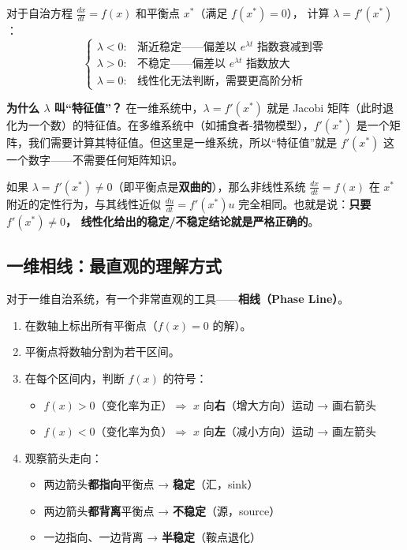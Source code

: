\documentclass[12pt,a4paper]{article}
\begin{document}
\begin{keypoint}
对于自治方程 $\frac{dx}{dt} = f(x)$ 和平衡点 $x^*$（满足 $f(x^*) = 0$），
计算 $\lambda = f'(x^*)$：
\[
\begin{cases}
\lambda < 0: & \text{渐近稳定——偏差以 } e^{\lambda t} \text{ 指数衰减到零} \\
\lambda > 0: & \text{不稳定——偏差以 } e^{\lambda t} \text{ 指数放大} \\
\lambda = 0: & \text{线性化无法判断，需要更高阶分析}
\end{cases}
\]
\end{keypoint}

\textbf{为什么 $\lambda$ 叫``特征值''？} 在一维系统中，$\lambda = f'(x^*)$ 就是 Jacobi 矩阵（此时退化为一个数）的特征值。在多维系统中（如捕食者-猎物模型），$f'(x^*)$ 是一个矩阵，我们需要计算其特征值。但这里是一维系统，所以``特征值''就是 $f'(x^*)$ 这一个数字——不需要任何矩阵知识。

\begin{theorybox}
如果 $\lambda = f'(x^*) \neq 0$（即平衡点是\textbf{双曲的}），那么非线性系统
$\frac{dx}{dt} = f(x)$ 在 $x^*$ 附近的定性行为，与其线性近似
$\frac{du}{dt} = f'(x^*) u$ 完全相同。也就是说：\textbf{只要 $f'(x^*) \neq 0$，
线性化给出的稳定/不稳定结论就是严格正确的}。
\end{theorybox}

\subsection{一维相线：最直观的理解方式}

对于一维自治系统，有一个非常直观的工具——\textbf{相线（Phase Line）}。

\begin{theorybox}[相线的画法]
\begin{enumerate}[label=(\arabic*)]
  \item 在数轴上标出所有平衡点（$f(x) = 0$ 的解）。
  \item 平衡点将数轴分割为若干区间。
  \item 在每个区间内，判断 $f(x)$ 的符号：
  \begin{itemize}
    \item $f(x) > 0$（变化率为正）$\Rightarrow$ $x$ 向\textbf{右}（增大方向）运动 → 画右箭头
    \item $f(x) < 0$（变化率为负）$\Rightarrow$ $x$ 向\textbf{左}（减小方向）运动 → 画左箭头
  \end{itemize}
  \item 观察箭头走向：
  \begin{itemize}
    \item 两边箭头\textbf{都指向}平衡点 → \textbf{稳定}（汇，sink）
    \item 两边箭头\textbf{都背离}平衡点 → \textbf{不稳定}（源，source）
    \item 一边指向、一边背离 → \textbf{半稳定}（鞍点退化）
  \end{itemize}
\end{enumerate}
\end{theorybox}
\end{document}
